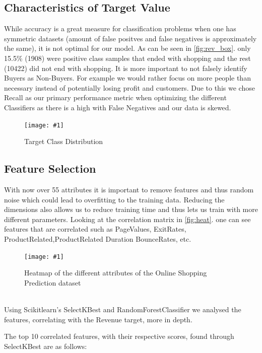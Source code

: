 \documentclass{article}
\newcommand{\image}[3]{
\begin{figure}
\begin{center}
\texttt{[image: \#1]}
\caption{#2}
#3
\end{center}
\end{figure}
}
\newcommand{\secref}[1]{\autoref{#1}. \texit{\nameref{#1}}}
\begin{document}
\subsection{Characteristics of Target Value}
While accuracy is a great measure for classification problems when one has symmetric datasets (amount of false positves and false negatives is approximately the same), it is not optimal for our model.
As can be seen in \secref{fig:rev_box} only 15.5\% (1908) were positive class samples that ended with shopping and the rest (10422) did not end with shopping. It is more important to not falsely identify Buyers as Non-Buyers. For example we would rather focus on more people than necessary instead of potentially losing profit and customers. Due to this we chose Recall as our primary performance metric when optimizing the different Classifiers as there is a high with False Negatives and our data is skewed.
\image{plots/revenue_boxplot.png}{Target Class Distribution}{\label{fig:rev_box}}

\subsection{Feature Selection}

With now over 55 attributes it is important to remove features and thus random noise which could lead to overfitting to the training data. Reducing the dimensions also allows us to reduce training time and thus lets us train with more different parameters. Looking at the correlation matrix in \secref{fig:heat} one can see features that are correlated such as PageValues, ExitRates, ProductRelated,ProductRelated Duration BounceRates, etc.
\image{plots/heatmap.png}{Heatmap of the different attributes of the Online Shopping Prediction dataset}{\label{fig:heat}} \\
\newline
Using Scikitlearn's SelectKBest and RandomForestClassifier we analysed the features, correlating with the Revenue target, more in depth. \\
\newline

The top 10 correlated features, with their respective scores, found through SelectKBest are as follows:
\end{document}
